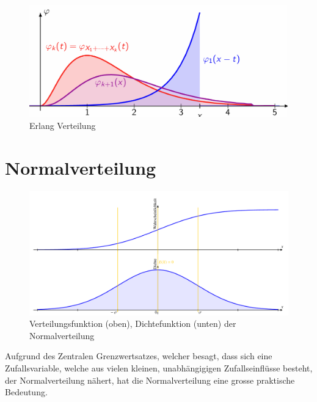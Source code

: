 \documentclass[../Main.tex]{subfiles}
\begin{document}
\begin{figure}[H]
    \centering
    \includegraphics[width=0.75\linewidth]{Images/erlang.png}
    \caption{Erlang Verteilung}
\end{figure}


\newpage

\section{Normalverteilung}


\begin{figure}[H]
    \centering
    \includegraphics[width=1\linewidth]{Images/normal-dichte-verteil}
    \caption{Verteilungsfunktion (oben), Dichtefunktion (unten) der Normalverteilung}
\end{figure}

Aufgrund des Zentralen Grenzwertsatzes, welcher besagt,
dass sich eine Zufallsvariable, welche aus vielen kleinen,
unabhängigigen Zufallseinflüsse besteht, der Normalverteilung
nähert, hat die Normalverteilung eine grosse praktische Bedeutung.
\end{document}
